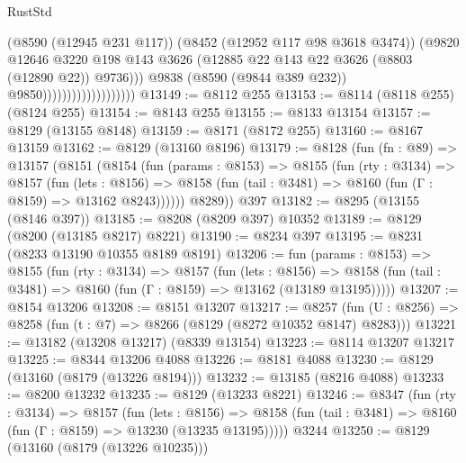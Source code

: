 \begin{lexlean}{RustStd}
\begin{coremodule}
                                            (@8590 (@12945 @231 @117))
                                            (@8452 (@12952 @117 @98 @3618 @3474))
                                            (@9820
                                              @12646
                                              @3220
                                              @198
                                              @143
                                              @3626
                                              (@12885
                                                @22
                                                @143
                                                @22
                                                @3626
                                                (@8803 (@12890 @22))
                                                @9736)))
                                          @9838
                                          (@8590 (@9844 @389 @232))
                                          @9850)))))))))))))))))))
@13149 := @8112 @255
@13153 := @8114 (@8118 @255) (@8124 @255)
@13154 := @8143 @255
@13155 := @8133 @13154
@13157 := @8129 (@13155 @8148)
@13159 := @8171 (@8172 @255)
@13160 := @8167 @13159
@13162 := @8129 (@13160 @8196)
@13179 := @8128
    (fun (fn : @89) =>
    @13157
      (@8151
        (@8154
          (fun (params : @8153) =>
          @8155
            (fun (rty : @3134) =>
            @8157
              (fun (lets : @8156) =>
              @8158 (fun (tail : @3481) => @8160 (fun (Γ : @8159) => @13162 @8243))))))
        @8289))
    @397
@13182 := @8295 (@13155 (@8146 @397))
@13185 := @8208 (@8209 @397) @10352
@13189 := @8129 (@8200 (@13185 @8217) @8221)
@13190 := @8234 @397
@13195 := @8231 (@8233 @13190 @10355 @8189 @8191)
@13206 := fun (params : @8153) =>
  @8155
    (fun (rty : @3134) =>
    @8157
      (fun (lets : @8156) =>
      @8158 (fun (tail : @3481) => @8160 (fun (Γ : @8159) => @13162 (@13189 @13195)))))
@13207 := @8154 @13206
@13208 := @8151 @13207
@13217 := @8257
    (fun (U : @8256) => @8258 (fun (t : @7) => @8266 (@8129 (@8272 @10352 @8147) @8283)))
@13221 := @13182 (@13208 @13217) (@8339 @13154)
@13223 := @8114 @13207 @13217
@13225 := @8344 @13206 @4088
@13226 := @8181 @4088
@13230 := @8129 (@13160 (@8179 (@13226 @8194)))
@13232 := @13185 (@8216 @4088)
@13233 := @8200 @13232
@13235 := @8129 (@13233 @8221)
@13246 := @8347
    (fun (rty : @3134) =>
    @8157
      (fun (lets : @8156) =>
      @8158 (fun (tail : @3481) => @8160 (fun (Γ : @8159) => @13230 (@13235 @13195)))))
    @3244
@13250 := @8129 (@13160 (@8179 (@13226 @10235)))

\end{coremodule}
\end{lexlean}
